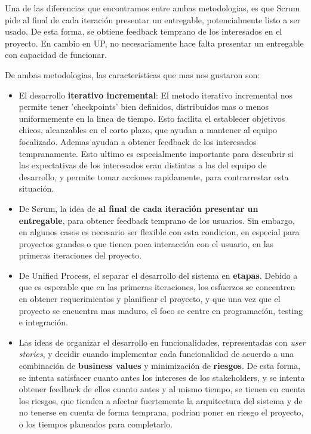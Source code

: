 	Una de las diferencias que encontramos entre ambas metodologias, es que Scrum pide al final de cada iteración presentar un entregable, potencialmente listo a ser usado. De esta forma, se obtiene feedback temprano de los interesados en el proyecto. En cambio en UP, no necesariamente hace falta presentar un entregable con capacidad de funcionar.

	De ambas metodologias, las caracteristicas que mas nos gustaron son:

	\begin{itemize}
		\item El desarrollo \textbf{iterativo incremental}: El metodo iterativo incremental nos permite tener 'checkpoints' bien definidos, distribuidos mas o menos uniformemente en la linea de tiempo. Esto facilita el establecer objetivos chicos, alcanzables en el corto plazo, que ayudan a mantener al equipo focalizado. Ademas ayudan a obtener feedback de los interesados tempranamente. Esto ultimo es especialmente importante para descubrir si las expectativas de los interesados eran distintas a las del equipo de desarrollo, y permite tomar acciones rapidamente, para contrarrestar esta situación.

		\item De Scrum, la idea de \textbf{al final de cada iteración presentar un entregable}, para obtener feedback temprano de los usuarios. Sin embargo, en algunos casos es necesario ser flexible con esta condicion, en especial para proyectos grandes o que tienen poca interacción con el usuario, en las primeras iteraciones del proyecto.

		\item De Unified Process, el separar el desarrollo del sistema en \textbf{etapas}. Debido a que es esperable que en las primeras iteraciones, los esfuerzos se concentren en obtener requerimientos y planificar el proyecto, y que una vez que el proyecto se encuentra mas maduro, el foco se centre en programación, testing e integración.

		\item Las ideas de organizar el desarrollo en funcionalidades, representadas con \emph{user stories}, y decidir cuando implementar cada funcionalidad de acuerdo a una combinación de \textbf{business values} y minimización de \textbf{riesgos}. De esta forma, se intenta satisfacer cuanto antes los intereses de los stakeholders, y se intenta obtener feedback de ellos cuanto antes y al mismo tiempo, se tienen en cuenta los riesgos, que tienden a afectar fuertemente la arquitectura del sistema y de no tenerse en cuenta de forma temprana, podrian poner en riesgo el proyecto, o los tiempos planeados para completarlo.


\end{itemize}
